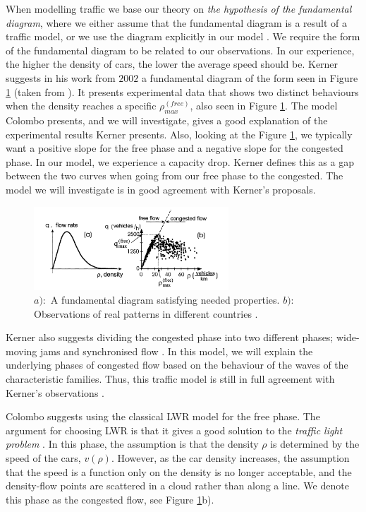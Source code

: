 \documentclass[10pt]{article}
\numberwithin{equation}{section}
\begin{document}
When modelling traffic we base our theory on \textit{the hypothesis of the fundamental diagram}, where we either assume that the fundamental diagram is a result of a traffic model, or we use the diagram explicitly in our model \cite[p.~254]{KernerHelbing}. We require the form of the fundamental diagram to be related to our observations. In our experience, the higher the density of cars, the lower the average speed should be. Kerner suggests in his work from $2002$ \cite{KernerHelbing} a fundamental diagram of the form seen in Figure \ref{fig:Kerner} (taken from  \cite[p. ~254]{KernerHelbing}). It presents experimental data that shows two distinct behaviours when the density reaches a specific $\rho_{max}^{(free)}$, also seen in Figure \ref{fig:Kerner}. The model Colombo presents, and we will investigate, gives a good explanation of the experimental results Kerner presents. Also, looking at the Figure \ref{fig:Kerner}, we typically want a positive slope for the free phase and a negative slope for the congested phase. In our model, we experience a capacity drop. Kerner defines this as a gap between the two curves \cite[p.~254]{KernerHelbing} when going from our free phase to the congested. The model we will investigate is in good agreement with Kerner's proposals. \begin{figure}[H]
    \centering
    \includegraphics[width=0.65\textwidth]{Figures/Model/Kerner.png}
    \caption{$a):$ A fundamental diagram satisfying needed properties. $b):$ Observations of real patterns in different countries \cite{KernerHelbing}. }
    \label{fig:Kerner}
\end{figure} Kerner also suggests dividing the congested phase into two different phases; wide-moving jams and synchronised flow \cite[p.~256]{KernerHelbing}. In this model, we will explain the underlying phases of congested flow based on the behaviour of the waves of the characteristic families. Thus, this traffic model is still in full agreement with Kerner's observations \cite{Colombo2003}.

Colombo suggests using the classical LWR model for the free phase. The argument for choosing LWR is that it gives a good solution to the \textit{traffic light problem} \cite[p.~71]{TrafficLight}. In this phase, the assumption is that the density $\rho$ is determined by the speed of the cars, $v(\rho)$. However, as the car density increases, the assumption that the speed is a function only on the density is no longer acceptable, and the density-flow points are scattered in a cloud rather than along a line. We denote this phase as the congested flow, see Figure \ref{fig:Kerner}b). 
\end{document}
